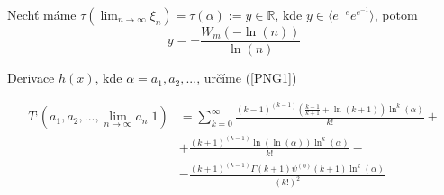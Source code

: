 \begin{theorem}
      Nechť máme \(\tau(\lim_{n \to \infty} \xi_n) = 
      \tau(\alpha) := y \in \mathbb{R}\), kde \(y \in 
      \langle e^{-e} e^{e^{-1}} \rangle\), potom
      \[y = - \frac{W_m(- \ln(n))}{\ln(n)}\]
\end{theorem}

Derivace \(h(x)\), kde \(\alpha = a_1, a_2, ...\), určíme (\ref{PNG1})

\begin{align}
      T^,(a_1, a_2, ..., \lim_{n \to \infty} a_n | 1) &= 
      \sum_{k=0}^{\infty} \frac{(k-1)^{(k-1)}\left(  
      \frac{k-1}{k+1} + \ln(k+1) \right) \ln^k(\alpha)}{k!} +\\
      &+ \frac{(k+1)^{(k-1)}\ln(\ln(\alpha)) \ln^k(\alpha)}{k!} - \\
      &-\frac{(k+1)^{(k-1)}\Gamma(k+1)\psi^{(0)}(k+1) \ln^k(\alpha)}{(k!)^2}
\end{align}
